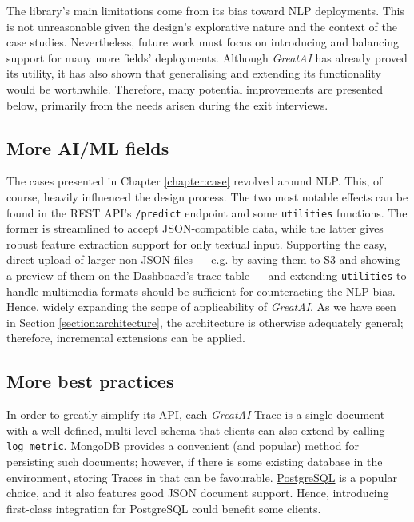The library's main limitations come from its bias toward NLP deployments. This is not unreasonable given the design's explorative nature and the context of the case studies. Nevertheless, future work must focus on introducing and balancing support for many more fields' deployments. Although \textit{GreatAI} has already proved its utility, it has also shown that generalising and extending its functionality would be worthwhile. Therefore, many potential improvements are presented below, primarily from the needs arisen during the exit interviews.

\subsection{More AI/ML fields}

The cases presented in Chapter \ref{chapter:case} revolved around NLP. This, of course, heavily influenced the design process. The two most notable effects can be found in the REST API's \texttt{/predict} endpoint and some \texttt{utilities} functions. The former is streamlined to accept JSON-compatible data, while the latter gives robust feature extraction support for only textual input. Supporting the easy, direct upload of larger non-JSON files --- e.g. by saving them to S3 and showing a preview of them on the Dashboard's trace table --- and extending \texttt{utilities} to handle multimedia formats should be sufficient for counteracting the NLP bias. Hence, widely expanding the scope of applicability of \textit{GreatAI}. As we have seen in Section \ref{section:architecture}, the architecture is otherwise adequately general; therefore, incremental extensions can be applied.

\subsection{More best practices}

In order to greatly simplify its API, each \textit{GreatAI} Trace is a single document with a well-defined, multi-level schema that clients can also extend by calling \texttt{log\_metric}. MongoDB provides a convenient (and popular) method for persisting such documents; however, if there is some existing database in the environment, storing Traces in that can be favourable. \href{https://www.postgresql.org/}{PostgreSQL} is a popular choice, and it also features good JSON document support. Hence, introducing first-class integration for PostgreSQL could benefit some clients.

